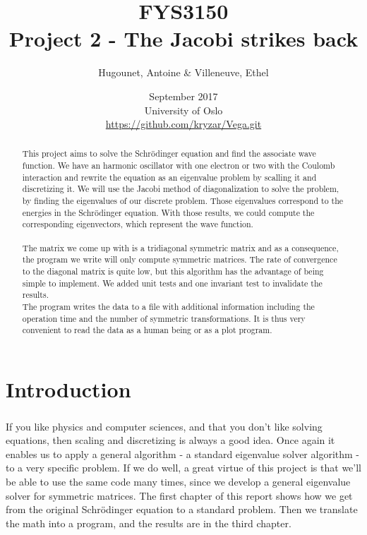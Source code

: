 \documentclass[a4paper, twoside, 11pt]{report}
\title{FYS3150\\Project 2 - The Jacobi strikes back}
\author{Hugounet, Antoine \& Villeneuve, Ethel}
\date{September 2017 \\University of Oslo \\ \url{https://github.com/kryzar/Vega.git}}
\theoremstyle{theorem}
\theoremstyle{remark}
\theoremstyle{exemple}
\begin{document}
\maketitle
	
	
\begin{abstract}
	\paragraph{}This project aims to solve the Schrödinger equation and find the associate wave function. We have an harmonic oscillator with one electron or two with the Coulomb interaction and rewrite the equation as an eigenvalue problem by scalling it and discretizing it. We will use the Jacobi method of diagonalization to solve the problem, by finding the eigenvalues of our discrete problem. Those eigenvalues correspond to the energies in the Schrödinger equation. With those results, we could compute the corresponding eigenvectors, which represent the wave function. 
	
	\paragraph{}The matrix we come up with is a tridiagonal symmetric matrix and as a consequence, the program we write will only compute symmetric matrices. The rate of convergence to the diagonal matrix is quite low, but this algorithm has the advantage of being simple to implement. We added unit tests and one invariant test to invalidate the results.
	\\The program writes the data to a file with additional information including the operation time and the number of symmetric transformations. It is thus very convenient to read the data as a human being or as a plot program.
\end{abstract}
\tableofcontents


\chapter*{Introduction}

    \paragraph{}If you like physics and computer sciences, and that you don't like solving equations, then scaling and discretizing is always a good idea. Once again it enables us to apply a general algorithm - a standard eigenvalue solver algorithm - to a very specific problem. If we do well, a great virtue of this project is that we'll be able to use the same code many times, since we develop a general eigenvalue solver for symmetric matrices. The first chapter of this report shows how we get from the original Schrödinger equation to a standard problem. Then we translate the math into a program, and the results are in the third chapter.
\end{document}
